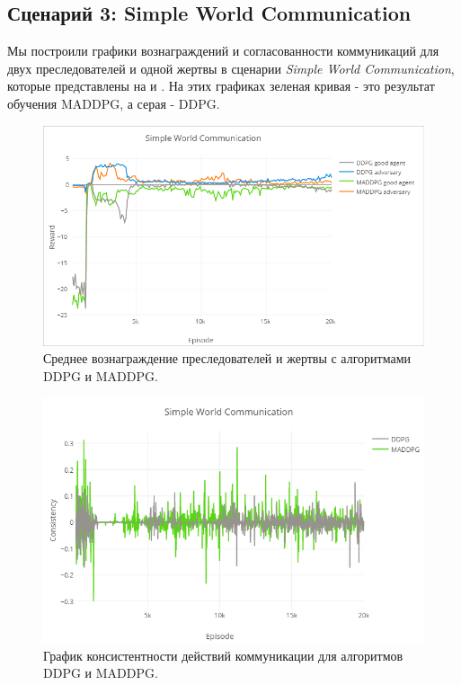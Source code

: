 \subsection{Сценарий 3: Simple World Communication} \label{exp-results-svc}

Мы построили графики вознаграждений и согласованности коммуникаций для двух преследователей и одной жертвы в сценарии \textit{Simple World Communication}, которые представлены на  и . На этих графиках зеленая кривая - это результат обучения MADDPG, а серая - DDPG.

\begin{figure}[ht!]
	\center
	\includegraphics [scale=0.6] {my_folder/images/ch5/swc-rew.png}
	\caption{Среднее вознаграждение преследователей и жертвы с алгоритмами DDPG и MADDPG.}
	\label{fig:result-swc-rew}
\end{figure}

\begin{figure}[ht!]
	\center
	\includegraphics [scale=0.6] {my_folder/images/ch5/swc-comm.png}
	\caption{График консистентности действий коммуникации для алгоритмов DDPG и MADDPG.}
	\label{fig:result-swc-comm}
\end{figure}

